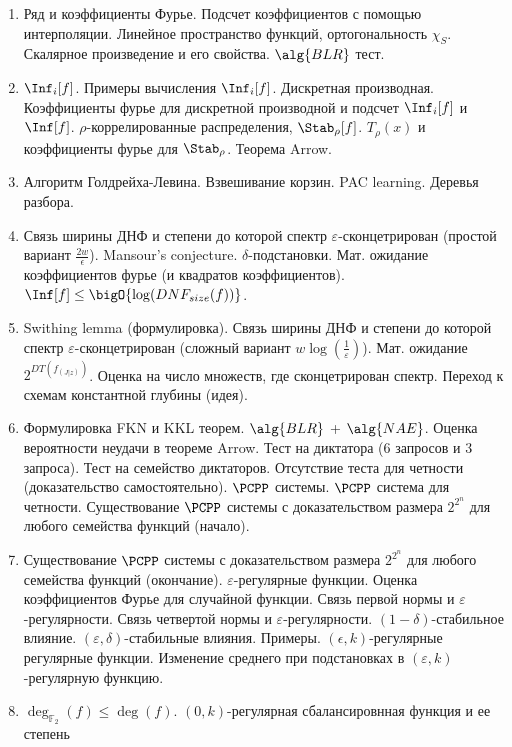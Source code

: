 \begin{enumerate}
    \item Ряд и коэффициенты Фурье. Подсчет коэффициентов с помощью интерполяции. Линейное пространство
        функций, ортогональность $\chi_S$. Скалярное произведение и его свойства. $\alg{BLR}$ тест.
    \item $\Inf_i[f]$. Примеры вычисления $\Inf_i[f]$. Дискретная производная. Коэффициенты фурье для
        дискретной производной и подсчет $\Inf_i[f]$ и $\Inf[f]$. $\rho$-коррелированные распределения,
        $\Stab_{\rho}[f]$. $T_{\rho}(x)$ и коэффициенты фурье для $\Stab_{\rho}$. Теорема Arrow.
    \item Алгоритм Голдрейха-Левина. Взвешивание корзин. PAC learning. Деревья разбора.
    \item Связь ширины ДНФ и степени до которой спектр $\varepsilon$-сконцетрирован (простой вариант
        $\frac{2w}{\epsilon}$). Mansour's conjecture. $\delta$-подстановки. Мат. ожидание коэффициентов
        фурье (и квадратов коэффициентов). $\Inf[f] \le \bigO{\log(DNF_{size}(f))}$.
    \item Swithing lemma (формулировка). Связь ширины ДНФ и степени до которой спектр
        $\varepsilon$-сконцетрирован (сложный вариант $w \log(\frac{1}{\varepsilon})$). Мат. ожидание
        $2^{DT(f_{(J|z)})}$. Оценка на число множеств, где сконцетрирован спектр. Переход к схемам
        константной глубины (идея).
    \item Формулировка FKN и KKL теорем. $\alg{BLR}$ + $\alg{NAE}$. Оценка вероятности неудачи в теореме
        Arrow. Тест на диктатора ($6$ запросов и $3$ запроса). Тест на семейство диктаторов. Отсутствие
        теста для четности (доказательство самостоятельно). $\PCPP$ системы. $\PCPP$ система для
        четности. Существование $\PCPP$ системы с доказательством размера $2^{2^{n}}$ для любого
        семейства функций (начало).
    \item Существование $\PCPP$ системы с доказательством размера $2^{2^{n}}$ для любого семейства
        функций (окончание). $\varepsilon$-регулярные функции. Оценка коэффициентов Фурье для случайной
        функции. Связь первой нормы и $\varepsilon$-регулярности. Связь четвертой нормы и
        $\varepsilon$-регулярности. $(1 - \delta)$-стабильное влияние. $(\varepsilon, \delta)$-стабильные
        влияния. Примеры. $(\epsilon, k)$-регулярные регулярные функции. Изменение среднего при
        подстановках в $(\varepsilon, k)$-регулярную функцию.
    \item $\deg_{\mathbb{F}_2}(f) \le \deg(f)$. $(0, k)$-регулярная сбалансировнная функция и ее степень

\end{enumerate}
